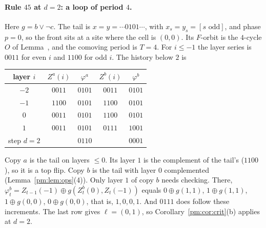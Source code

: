 \paragraph{Rule $45$ at $d=2$: a loop of period $4$.} Here $g=b\vee\neg c$. The tail is $x=y=\cdots0101\cdots$, with $x_s=y_s=[s\text{ odd}]$, and phase $p=0$, so the front sits at a site where the cell is $(0,0)$. Its $F$-orbit is the $4$-cycle $O$ of Lemma~, and the comoving period is $T=4$. For $i\le-1$ the layer series is $0011$ for even $i$ and $1100$ for odd $i$. The history below $2$ is
\begin{center}
\begin{tabular}{ccccc}
\toprule
layer $i$ & $Z^a(i)$ & $\varphi^a$ & $Z^b(i)$ & $\varphi^b$\\
\midrule
$-2$ & $0011$ & $0101$ & $0011$ & $0101$\\
$-1$ & $1100$ & $0101$ & $1100$ & $0101$\\
$0$ & $0011$ & $0101$ & $1100$ & $0101$\\
$1$ & $0011$ & $0101$ & $0111$ & $1001$\\
\midrule
step $d=2$ & & $0110$ & & $0001$\\
\bottomrule
\end{tabular}
\end{center}
Copy $a$ is the tail on layers $\le0$. Its layer $1$ is the complement of the tail's ($1100$), so it is a top flip. Copy $b$ is the tail with layer $0$ complemented (Lemma~\ref{pm:lem:ops}(4)). Only layer $1$ of copy $b$ needs checking. There, $\varphi^b_t=Z_{t-1}(-1)\oplus g(Z^b_t(0),Z_t(-1))$ equals $0\oplus g(1,1)$, $1\oplus g(1,1)$, $1\oplus g(0,0)$, $0\oplus g(0,0)$, that is, $1,0,0,1$. And $0111$ does follow these increments. The last row gives $\ell=(0,1)$, so Corollary~\ref{pm:cor:crit}(b) applies at $d=2$.

